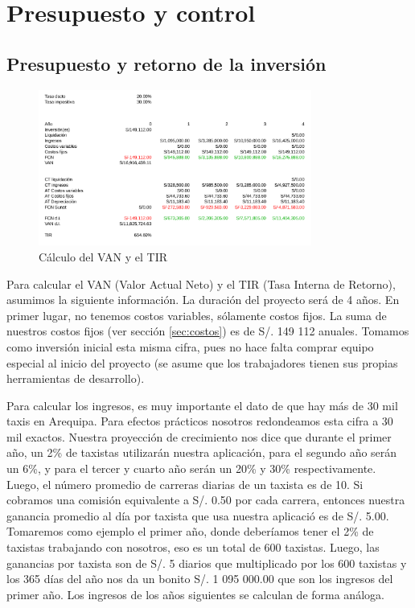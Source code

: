 \chapter{Presupuesto y control}

\section{Presupuesto y retorno de la inversión}

\begin{figure}[htb]
\centering
\includegraphics[width=0.8\textwidth]{./img/van_tir}
\caption{Cálculo del VAN y el TIR} \label{fig:van_tir}
\end{figure}

Para calcular el VAN (Valor Actual Neto) y el TIR (Tasa Interna de Retorno), asumimos la siguiente información. La duración del proyecto será de 4 años. En primer lugar, no tenemos costos variables, sólamente costos fijos. La suma de nuestros costos fijos (ver sección \ref{sec:costos}) es de S/. 149 112 anuales. Tomamos como inversión inicial esta misma cifra, pues no hace falta comprar equipo especial al inicio del proyecto (se asume que los trabajadores tienen sus propias herramientas de desarrollo).

Para calcular los ingresos, es muy importante el dato de que hay más de 30 mil taxis en Arequipa. Para efectos prácticos nosotros redondeamos esta cifra a 30 mil exactos. Nuestra proyección de crecimiento nos dice que durante el primer año, un 2\% de taxistas utilizarán nuestra aplicación, para el segundo año serán un 6\%, y para el tercer y cuarto año serán un 20\% y 30\% respectivamente. Luego, el número promedio de carreras diarias de un taxista es de 10. Si cobramos una comisión equivalente a S/. 0.50 por cada carrera, entonces nuestra ganancia promedio al día por taxista que usa nuestra aplicació es de S/. 5.00. Tomaremos como ejemplo el primer año, donde deberíamos tener el 2\% de taxistas trabajando con nosotros, eso es un total de 600 taxistas. Luego, las ganancias por taxista son de S/. 5 diarios que multiplicado por los 600 taxistas y los 365 días del año nos da un bonito S/. 1 095 000.00 que son los ingresos del primer año. Los ingresos de los años siguientes se calculan de forma análoga.

